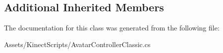 \subsection*{Additional Inherited Members}


The documentation for this class was generated from the following file\+:\begin{DoxyCompactItemize}
\item 
Assets/\+Kinect\+Scripts/Avatar\+Controller\+Classic.\+cs\end{DoxyCompactItemize}
